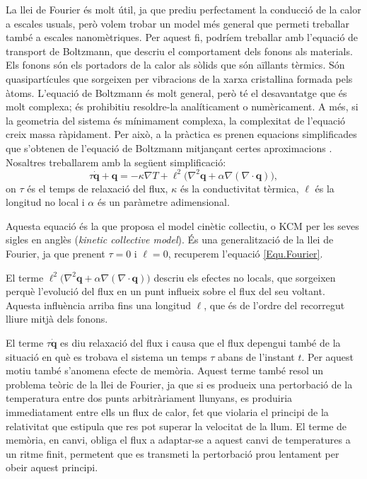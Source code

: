 \documentclass{article}
\begin{document}
La llei de Fourier \'{e}s molt \'{u}til, ja que prediu perfectament la conducci\'{o} de la calor a escales usuals, per\`{o} volem trobar un model m\'{e}s general que permeti treballar tamb\'{e} a escales nanom\`{e}triques. Per aquest fi, podr\'{i}em treballar amb l'equaci\'{o} de transport de Boltzmann, que descriu el comportament dels fonons als materials. Els fonons s\'{o}n els portadors de la calor als s\`{o}lids que s\'{o}n a\"{i}llants t\`{e}rmics. S\'{o}n quasipart\'{i}cules que sorgeixen per vibracions de la xarxa cristal\textperiodcentered lina formada pels \`{a}toms. L'equaci\'{o} de Boltzmann \'{e}s molt general, per\`{o} t\'{e} el desavantatge que \'{e}s molt complexa; \'{e}s prohibitiu resoldre-la anal\'{i}ticament o num\`{e}ricament. A m\'{e}s, si la geometria del sistema \'{e}s m\'{i}nimament complexa, la complexitat de l'equaci\'{o} creix massa r\`{a}pidament. Per aix\`{o}, a la pr\`{a}ctica es prenen equacions simplificades que s'obtenen de l'equaci\'{o} de Boltzmann mitjan\c{c}ant certes aproximacions \cite{sendra2021derivation}. Nosaltres treballarem amb la seg\"{u}ent simplificaci\'{o}:
\begin{equation}\label{Equ.KCM}
\tau\dot{\boldsymbol{q}}+\boldsymbol{q}=-\kappa\nabla T+\ell^2\big(\nabla^2\boldsymbol{q}+\alpha\nabla(\nabla\cdot\boldsymbol{q})\big),
\end{equation}
on $\tau$ \'{e}s el temps de relaxaci\'{o} del flux, $\kappa$ \'{e}s la conductivitat t\`{e}rmica, $\ell$ \'{e}s la longitud no local i $\alpha$ \'{e}s un par\`{a}metre adimensional.

Aquesta equaci\'{o} \'{e}s la que proposa el model cin\`{e}tic col\textperiodcentered lectiu, o KCM per les seves sigles en angl\`{e}s (\emph{kinetic collective model}). \'{E}s una generalitzaci\'{o} de la llei de Fourier, ja que prenent $\tau=0$ i $\ell=0$, recuperem l'equaci\'{o} \eqref{Equ.Fourier}.

El terme $\ell^2\big(\nabla^2\boldsymbol{q}+\alpha\nabla(\nabla\cdot\boldsymbol{q})\big)$ descriu els efectes no locals, que sorgeixen perqu\`{e} l'evoluci\'{o} del flux en un punt influeix sobre el flux del seu voltant. Aquesta influ\`{e}ncia arriba fins una longitud $\ell$, que \'{e}s de l'ordre del recorregut lliure mitj\`{a} dels fonons.

El terme $\tau\dot{\boldsymbol{q}}$ es diu relaxaci\'{o} del flux i causa que el flux depengui tamb\'{e} de la situaci\'{o} en qu\`{e} es trobava el sistema un temps $\tau$ abans de l'instant $t$. Per aquest motiu tamb\'{e} s'anomena efecte de mem\`{o}ria. Aquest terme tamb\'{e} resol un problema te\`{o}ric de la llei de Fourier, ja que si es produeix una pertorbaci\'{o} de la temperatura entre dos punts arbitr\`{a}riament llunyans, es produiria immediatament entre ells un flux de calor, fet que violaria el principi de la relativitat que estipula que res pot superar la velocitat de la llum. El terme de mem\`{o}ria, en canvi, obliga el flux a adaptar-se a aquest canvi de temperatures a un ritme finit, permetent que es transmeti la pertorbaci\'{o} prou lentament per obeir aquest principi.
\end{document}
